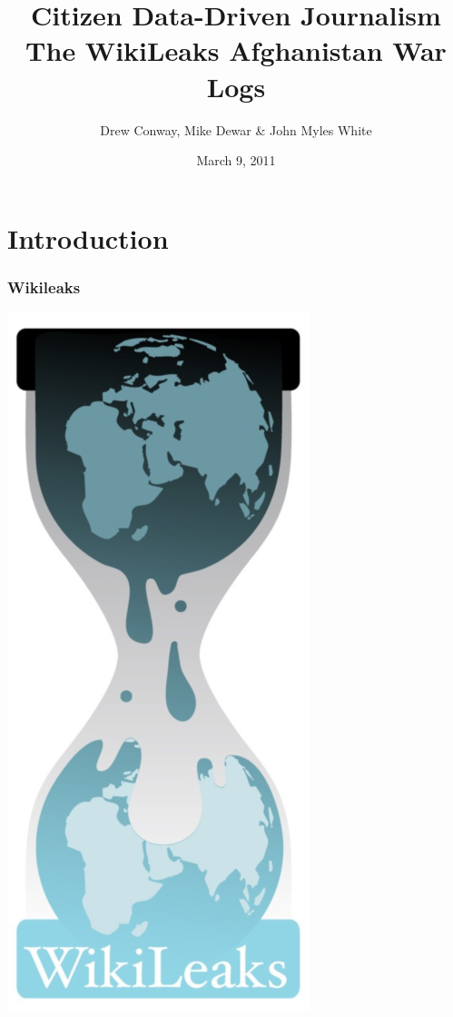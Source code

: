 \documentclass[xcolor=dvipsnames, 9pt]{beamer}
\title{Citizen Data-Driven Journalism\\The WikiLeaks Afghanistan War Logs}
\author{Drew Conway, Mike Dewar \& John Myles White}
\date{March 9, 2011}
\begin{document}
    
\ifpdf
{}
\else
{}
\fi
\graphicspath{{images/}}

\begin{frame}[plain]
  \titlepage  
\end{frame}



\section{Introduction}

\begin{frame}
	\frametitle{Wikileaks}
	\begin{center}
    \includegraphics[height=0.8\textheight]{wikileaks_eggtimer.png}
    \end{center}
\end{frame}
\end{document}
